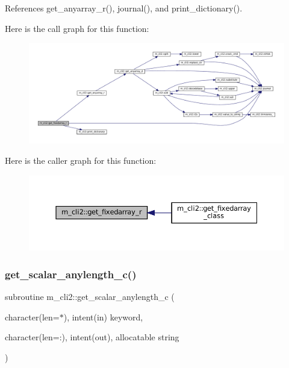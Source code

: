 References get\+\_\+anyarray\+\_\+r(), journal(), and print\+\_\+dictionary().

Here is the call graph for this function\+:\nopagebreak
\begin{figure}[H]
\begin{center}
\leavevmode
\includegraphics[width=350pt]{namespacem__cli2_afbec790abad0dca990c0a61cd2d9e9ae_cgraph}
\end{center}
\end{figure}
Here is the caller graph for this function\+:\nopagebreak
\begin{figure}[H]
\begin{center}
\leavevmode
\includegraphics[width=350pt]{namespacem__cli2_afbec790abad0dca990c0a61cd2d9e9ae_icgraph}
\end{center}
\end{figure}
\mbox{\label{namespacem__cli2_a7429381c83a021ba3ffb32ed58e17a0e}} 
\subsubsection{\texorpdfstring{get\+\_\+scalar\+\_\+anylength\+\_\+c()}{get\_scalar\_anylength\_c()}}
{\footnotesize\ttfamily subroutine m\+\_\+cli2\+::get\+\_\+scalar\+\_\+anylength\+\_\+c (\begin{DoxyParamCaption}\item[{character(len=$\ast$), intent(in)}]{keyword,  }\item[{character(len=\+:), intent(out), allocatable}]{string }\end{DoxyParamCaption})\hspace{0.3cm}{\ttfamily [private]}}



